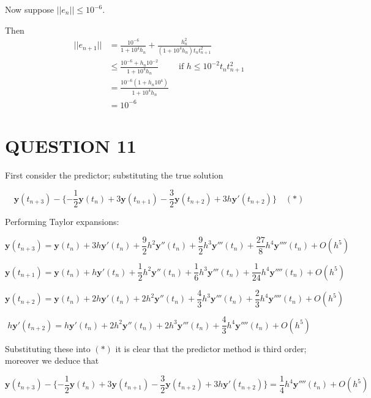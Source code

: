 \documentclass[a4paper]{article}
\begin{document}
Now suppose $ | | e_{n} | | \leq 10^{-6} $. 

Then 
\begin{align*}
| | e_{n+1} | | & =  \frac{10^{-6}}{1 + 10^{4} h_{n}}   + \frac{h_{n}^{2}}{(1 + 10^{4} h_{n})t_{n}t_{n+1}^{2}} \\
& \leq \frac{10^{-6} + h_{n} 10^{-2}}{1 + 10^{4} h_{n}} \qquad \text{ if } h \leq 10^{-2} t_{n} t_{n+1}^{2} \\
& = \frac{10^{-6} (  1 + h_{n} 10^{4} )  }{1 + 10^{4} h_{n}} \\
& = 10^{-6}
\end{align*}




\section{QUESTION 11}

First consider the predictor; substituting the true solution

\[ \mathbf{y}(t_{n+3}) - \{  - \frac{1}{2} \mathbf{y}(t_{n}) + 3 \mathbf{y}(t_{n+1})  - \frac{3}{2} \mathbf{y}(t_{n+2}) + 3h\mathbf{y}'(t_{n+2})  \} \quad (*) \]

Performing Taylor expansions:

\[ \mathbf{y}(t_{n+3}) = \mathbf{y}(t_{n}) + 3h \mathbf{y}'(t_{n}) + \frac{9}{2} h^{2} \mathbf{y}''(t_{n}) + \frac{9}{2} h^{3}  \mathbf{y}'''(t_{n}) + \frac{27}{8} h^{4} \mathbf{y}''''(t_{n})+ O(h^{5}) \]


\[ \mathbf{y}(t_{n+1}) = \mathbf{y}(t_{n}) + h \mathbf{y}'(t_{n}) + \frac{1}{2} h^{2} \mathbf{y}''(t_{n}) + \frac{1}{6} h^{3}  \mathbf{y}'''(t_{n}) + \frac{1}{24} h^{4} \mathbf{y}''''(t_{n})+ O(h^{5}) \]



\[ \mathbf{y}(t_{n+2}) = \mathbf{y}(t_{n}) + 2h \mathbf{y}'(t_{n}) + 2 h^{2} \mathbf{y}''(t_{n}) + \frac{4}{3} h^{3}  \mathbf{y}'''(t_{n}) + \frac{2}{3} h^{4} \mathbf{y}''''(t_{n})+ O(h^{5}) \]

\[ h\mathbf{y}'(t_{n+2}) = h \mathbf{y}'(t_{n}) + 2h^{2} \mathbf{y}''(t_{n}) + 2 h^{3} \mathbf{y}'''(t_{n}) + \frac{4}{3} h^{4}  \mathbf{y}''''(t_{n}) + O(h^{5}) \]

Substituting these into $ (*) $ it is clear that the predictor method is third order; moreover we deduce that 

\[ \mathbf{y}(t_{n+3}) - \{  - \frac{1}{2} \mathbf{y}(t_{n}) + 3 \mathbf{y}(t_{n+1})  - \frac{3}{2} \mathbf{y}(t_{n+2}) + 3h\mathbf{y}'(t_{n+2})  \} =  \frac{1}{4} h^{4} \mathbf{y}''''(t_{n}) + O(h^{5})   \]
\end{document}
